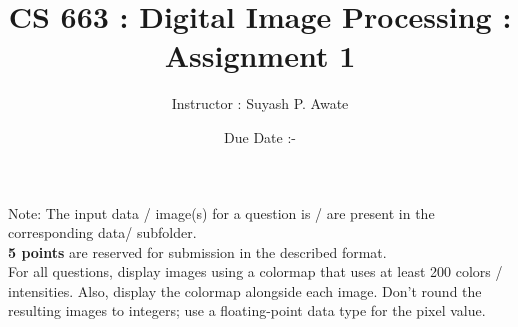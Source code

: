 \documentclass[11pt]{article}
\title {CS 663 : Digital Image Processing : Assignment 1}
\author {Instructor : Suyash P. Awate}
\date {Due Date :-}
\begin{document}
\maketitle

\setlength{\parindent}{0cm}

Note: The input data / image(s) for a question is / are present in the corresponding data/ subfolder.
\\

{\bf 5 points} are reserved for submission in the described format.
\\

For all questions, display images using a colormap that uses at least 200 colors / intensities. Also, display the colormap alongside each image. Don't
round the resulting images to integers; use a floating-point data type for the pixel value.
\end{document}
